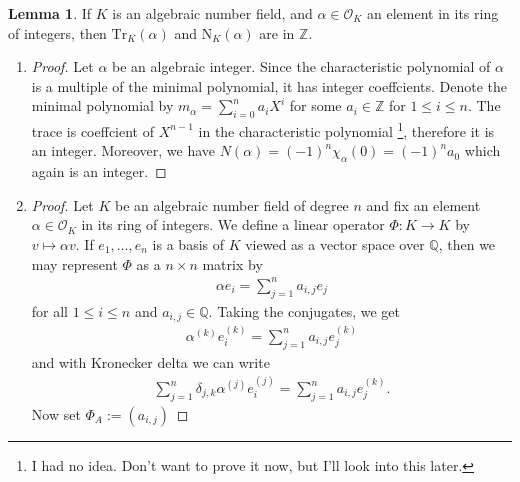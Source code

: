 \documentclass[a4paper]{book}
\theoremstyle{definition}
\newtheorem{lemma}[definition]{Lemma}
\begin{document}
\begin{thmbox}
    \begin{lemma}
        If \(K\) is an algebraic number field, and \(\alpha \in \mathcal{O}_K\) an element in its ring of integers, then \(\mathrm{Tr}_K(\alpha)\) and \(\mathrm{N}_K(\alpha)\) are in \(\mathbb{Z}\).
    \end{lemma}
\end{thmbox}
\begin{enumerate}
    \item \begin{proof} Let \(\alpha\) be an algebraic integer. Since the characteristic polynomial of \(\alpha\) is a multiple of the minimal polynomial, it has integer coeffcients. Denote the minimal polynomial by \(m_\alpha = \sum_{i=0}^n a_i X^i\) for some \(a_i \in \mathbb{Z}\) for \(1 \leq i \leq n\). The trace is coeffcient of \(X^{n-1}\) in the characteristic polynomial \footnote{I had no idea. Don't want to prove it now, but I'll look into this later.}, therefore it is an integer. Moreover, we have \(N(\alpha) = (-1)^n \chi_\alpha(0) = (-1)^n a_0\) which again is an integer.
    \end{proof}
    \item \begin{proof}
        Let \(K\) be an algebraic number field of degree \(n\) and fix an element \(\alpha \in \mathcal{O}_K\) in its ring of integers. We define a linear operator \(\Phi: K \longrightarrow K\) by \(v \mapsto \alpha v\). If \(e_1, \ldots, e_n\) is a basis of \(K\) viewed as a vector space over \(\mathbb{Q}\), then we may represent \(\Phi\) as a \(n \times n\) matrix by
        \begin{align*}
            \alpha e_i = \sum_{j=1}^n a_{i, j} e_j
        \end{align*}
        for all \(1 \leq i \leq n\) and \(a_{i, j} \in \mathbb{Q}\). Taking the conjugates, we get
        \begin{align*}
            \alpha^{(k)} e_i^{(k)} = \sum_{j=1}^n a_{i, j} e_j^{(k)}
        \end{align*}
        and with Kronecker delta we can write
        \begin{align*}
            \sum_{j=1}^n \delta_{j, k} \alpha^{(j)} e_i^{(j)} = \sum_{j=1}^n a_{i, j} e_j^{(k)} \text{.}
        \end{align*}
        Now set \(\Phi_A := (a_{i, j})\)
    \end{proof}
\end{enumerate}
\end{document}
